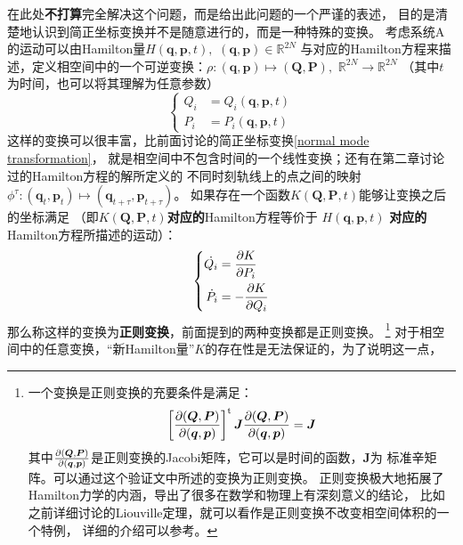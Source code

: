     在此处\textbf{不打算}完全解决这个问题，而是给出此问题的一个严谨的表述，
    目的是清楚地认识到简正坐标变换并不是随意进行的，而是一种特殊的变换。
    考虑系统A的运动可以由Hamilton量$H(\bm{q},\bm{p},t),\,\,(\bm{q},\bm{p})\in\mathbb{R}^{2N}$
    与对应的Hamilton方程来描述，定义相空间中的一个可逆变换：$\rho:(\bm{q},\bm{p})\mapsto(\bm{Q}, \bm{P}),\,\,\mathbb{R}^{2N}\to\mathbb{R}^{2N}$
    （其中$t$为时间，也可以将其理解为任意参数）
    \begin{equation}
        \left\{
        \begin{split}
            Q_i &= Q_i(\bm{q},\bm{p}, t)\\
            P_i &= P_i(\bm{q}, \bm{p}, t)
        \end{split}
        \right.
    \end{equation}
    这样的变换可以很丰富，比前面讨论的简正坐标变换\ref{normal mode transformation}，
    就是相空间中不包含时间的一个线性变换；还有在第二章讨论过的Hamilton方程的解所定义的
    不同时刻轨线上的点之间的映射
    $\phi^{\tau}:(\bm{q}_{t},\bm{p}_{t})\mapsto(\bm{q}_{t+\tau},\bm{p}_{t+\tau})$。
    如果存在一个函数$K(\bm{Q}, \bm{P}, t)$能够让变换之后的坐标满足
    （即$K(\bm{Q}, \bm{P}, t)$\textbf{对应的}Hamilton方程等价于
    $H(\bm{q},\bm{p},t)$
    \textbf{对应的}Hamilton方程所描述的运动）：
    \begin{equation}
        \left\{
        \begin{split}
            \dot{Q_i} &= \frac{\partial{K}}{\partial{P_i}}\\
            \dot{P_{i}} &= -\frac{\partial{K}}{\partial{Q_i}}
        \end{split}
        \right.
    \end{equation}
    那么称这样的变换为\textbf{正则变换}，前面提到的两种变换都是正则变换。
    \footnote{
        一个变换是正则变换的充要条件是满足：
        \begin{equation}
            \left[\frac{\partial{(\bm{Q},\bm{P})}}{\partial{(\bm{q}, \bm{p})}}\right]^{\mathrm{t}}\bm{J}\frac{\partial{(\bm{Q},\bm{P})}}{\partial{(\bm{q}, \bm{p})}} = \bm{J}
        \end{equation}
        其中$\frac{\partial{(\bm{Q},\bm{P})}}{\partial{(\bm{q}, \bm{p})}}$是正则变换的Jacobi矩阵，它可以是时间的函数，$\bm{J}$为
        标准辛矩阵。可以通过这个验证文中所述的变换为正则变换。
        正则变换极大地拓展了Hamilton力学的内涵，导出了很多在数学和物理上有深刻意义的结论，
        比如之前详细讨论的Liouville定理，就可以看作是正则变换不改变相空间体积的一个特例，
        详细的介绍可以参考\cite{Goldstein2000Classical}。
    }
    对于相空间中的任意变换，“新Hamilton量”$K$的存在性是无法保证的，为了说明这一点，
